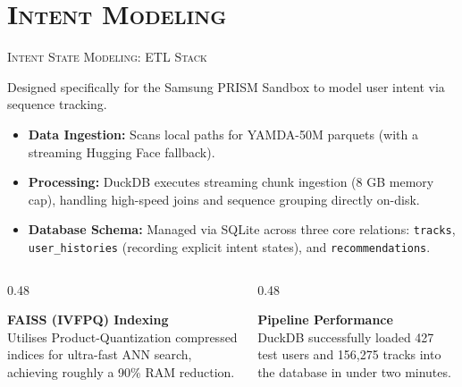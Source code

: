 \documentclass[xcolor=dvipsnames, aspectratio=1610]{beamer}
\begin{document}
\section{\textsc{Intent Modeling}}
\begin{frame}{\textsc{Intent State Modeling: ETL Stack}}

  Designed specifically for the Samsung PRISM Sandbox to model user intent via sequence tracking.

  \vspace{2.5mm}
  \begin{itemize}
    \item \textbf{Data Ingestion:} Scans local paths for YAMDA-50M parquets (with a streaming Hugging Face fallback).
    \item \textbf{Processing:} DuckDB executes streaming chunk ingestion (8 GB memory cap), handling high-speed joins and sequence grouping directly on-disk.
    \item \textbf{Database Schema:} Managed via SQLite across three core relations: \texttt{tracks}, \texttt{user\_histories} (recording explicit intent states), and \texttt{recommendations}.
  \end{itemize}

  \vspace{2.5mm}
  \begin{columns}[T]
    \begin{column}{0.48\linewidth}
      \begin{ExampleBox}
        \textbf{FAISS (IVFPQ) Indexing} \\
        Utilises Product-Quantization compressed indices for ultra-fast ANN search, achieving roughly a 90\% RAM reduction.
      \end{ExampleBox}
    \end{column}
    \begin{column}{0.48\linewidth}
      \begin{CommentBox}
        \textbf{Pipeline Performance} \\
        DuckDB successfully loaded 427 test users and 156,275 tracks into the database in under two minutes.
      \end{CommentBox}
    \end{column}
  \end{columns}

\end{frame}

\end{document}

